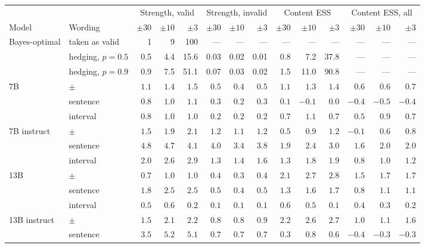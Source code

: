 \begin{tabular}{llrrrrrrrrrrrr}
\toprule
& & \multicolumn{3}{c}{Strength, valid} & \multicolumn{3}{c}{Strength, invalid} & \multicolumn{3}{c}{Content ESS} & \multicolumn{3}{c}{Content ESS, all} \\
\cmidrule(lr){3-5}\cmidrule(lr){6-8}\cmidrule(lr){9-11}\cmidrule(lr){12-14}
Model & Wording & $\pm 30$ & $\pm 10$ & $\pm 3$ & $\pm 30$ & $\pm 10$ & $\pm 3$ & $\pm 30$ & $\pm 10$ & $\pm 3$ & $\pm 30$ & $\pm 10$ & $\pm 3$ \\
\midrule
Bayes-optimal & taken as valid & 1 & 9 & 100 & --- & --- & --- & --- & --- & --- & --- & --- & --- \\
 & hedging, $p = 0.5$ & 0.5 & 4.4 & 15.6 & 0.03 & 0.02 & 0.01 & 0.8 & 7.2 & 37.8 & --- & --- & --- \\
 & hedging, $p = 0.9$ & 0.9 & 7.5 & 51.1 & 0.07 & 0.03 & 0.02 & 1.5 & 11.0 & 90.8 & --- & --- & --- \\
\midrule
7B & $\pm$ & $1.1$ & $1.4$ & $1.5$ & $0.5$ & $0.4$ & $0.5$ & $1.1$ & $1.3$ & $1.4$ & $0.6$ & $0.6$ & $0.7$ \\
 & sentence & $0.8$ & $1.0$ & $1.1$ & $0.3$ & $0.2$ & $0.3$ & $0.1$ & $-0.1$ & $0.0$ & $-0.4$ & $-0.5$ & $-0.4$ \\
 & interval & $0.8$ & $1.0$ & $1.0$ & $0.2$ & $0.2$ & $0.2$ & $0.7$ & $1.1$ & $0.7$ & $0.5$ & $0.9$ & $0.7$ \\
7B instruct & $\pm$ & $1.5$ & $1.9$ & $2.1$ & $1.2$ & $1.1$ & $1.2$ & $0.5$ & $0.9$ & $1.2$ & $-0.1$ & $0.6$ & $0.8$ \\
 & sentence & $4.8$ & $4.7$ & $4.1$ & $4.0$ & $3.4$ & $3.8$ & $1.9$ & $2.4$ & $3.0$ & $1.6$ & $2.0$ & $2.0$ \\
 & interval & $2.0$ & $2.6$ & $2.9$ & $1.3$ & $1.4$ & $1.6$ & $1.3$ & $1.8$ & $1.9$ & $0.8$ & $1.0$ & $1.2$ \\
13B & $\pm$ & $0.7$ & $1.0$ & $1.0$ & $0.4$ & $0.3$ & $0.4$ & $2.1$ & $2.7$ & $2.8$ & $1.5$ & $1.7$ & $1.7$ \\
 & sentence & $1.8$ & $2.5$ & $2.5$ & $0.5$ & $0.4$ & $0.5$ & $1.3$ & $1.6$ & $1.7$ & $0.8$ & $1.1$ & $1.1$ \\
 & interval & $0.5$ & $0.6$ & $0.2$ & $0.1$ & $0.1$ & $0.1$ & $0.6$ & $0.5$ & $0.1$ & $0.4$ & $0.3$ & $0.2$ \\
13B instruct & $\pm$ & $1.5$ & $2.1$ & $2.2$ & $0.8$ & $0.8$ & $0.9$ & $2.2$ & $2.6$ & $2.7$ & $1.0$ & $1.1$ & $1.6$ \\
 & sentence & $3.5$ & $5.2$ & $5.1$ & $0.7$ & $0.7$ & $0.7$ & $0.3$ & $0.8$ & $0.6$ & $-0.4$ & $-0.3$ & $-0.3$ \\

\end{tabular}
